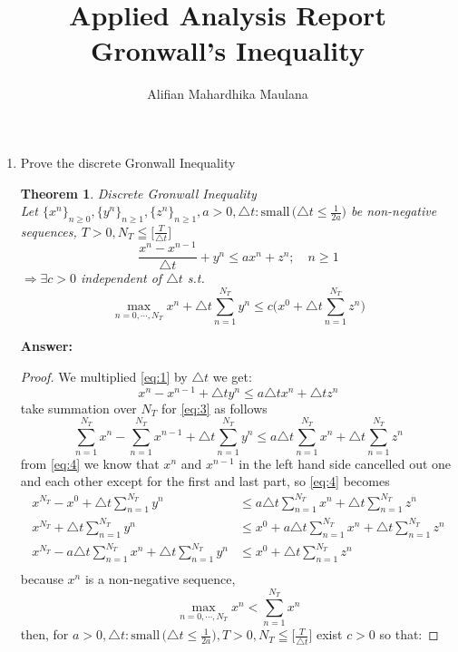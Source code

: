 \documentclass[a4paper,12pt]{article}
\title{Applied Analysis Report \\ Gronwall's Inequality}
\author{Alifian Mahardhika Maulana}
\newtheorem{theorem}{Theorem}
\begin{document}
\maketitle
\begin{enumerate}
	\item Prove the discrete Gronwall Inequality
		\begin{theorem} Discrete Gronwall Inequality\\
			Let $\{x^n\}_{n\geq 0},\{y^n\}_{n\geq 1},\{z^n\}_{n\geq 1},a>0,\triangle t: \text{small}\,\big( \triangle t \leq \frac{1}{2a} \big)$ be non-negative sequences, $T>0, N_T\leqq \big[ \frac{T}{\triangle t} \big]$
			\begin{equation}\label{eq:1}
			\frac{x^n - x^{n-1}}{\triangle t} + y^n \leq ax^n + z^n; \quad n\geq 1
			\end{equation}
			$\Rightarrow \exists c > 0$ independent of $\triangle t$ s.t.
			\begin{equation}\label{eq:2}
			\max_{n=0,\cdots,N_T} x^n + \triangle t \sum_{n=1}^{N_T}y^n \leq c\bigg(x^0 + \triangle t \sum_{n=1}^{N_T} z^n\bigg)
			\end{equation}
		\end{theorem}
	\textbf{Answer:}
	\begin{proof}
		We multiplied \eqref{eq:1} by $\triangle t$ we get:
		\begin{equation}\label{eq:3}
		x^n - x^{n-1}+ \triangle t y^n \leq a \triangle t x^n + \triangle t z^n
		\end{equation}
		take summation over $N_T$ for \eqref{eq:3} as follows
		\begin{equation}\label{eq:4}
		\sum_{n=1}^{N_T}x^n - \sum_{n=1}^{N_T}x^{n-1}+ \triangle t \sum_{n=1}^{N_T}y^n \leq a \triangle t \sum_{n=1}^{N_T}x^n + \triangle t \sum_{n=1}^{N_T}z^n
		\end{equation}
		from \eqref{eq:4} we know that $x^n$ and $x^{n-1}$ in the left hand side cancelled out one and each other except for the first and last part, so \eqref{eq:4} becomes
		\begin{align*}
		x^{N_T} -x^0 + \triangle t \sum_{n=1}^{N_T}y^n &\leq a \triangle t \sum_{n=1}^{N_T}x^n + \triangle t \sum_{n=1}^{N_T}z^n\\
		x^{N_T} + \triangle t \sum_{n=1}^{N_T}y^n &\leq x^0 + a \triangle t \sum_{n=1}^{N_T}x^n + \triangle t \sum_{n=1}^{N_T}z^n\\
		x^{N_T} - a \triangle t \sum_{n=1}^{N_T}x^n + \triangle t \sum_{n=1}^{N_T}y^n &\leq x^0 + \triangle t \sum_{n=1}^{N_T}z^n\\
		\end{align*}
		because $x^n$ is a non-negative sequence, $$\max_{n=0,\cdots,N_T} x^n < \sum_{n=1}^{N_T}x^n$$
		then, for $a>0,\triangle t: \text{small}\,\big( \triangle t \leq \frac{1}{2a} \big), T>0, N_T\leqq \big[ \frac{T}{\triangle t} \big]$ exist $c>0$ so that:
		
	\end{proof}
\end{enumerate}
\end{document}
